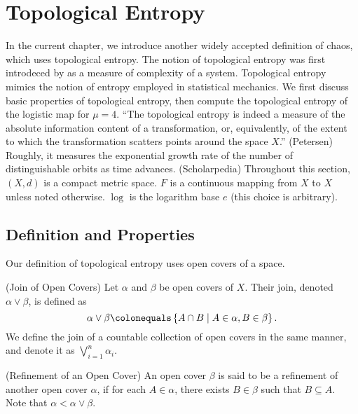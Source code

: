 \documentclass[12pt,twoside,draft]{book}
\begin{document}
\chapter{Topological Entropy}
In the current chapter, we introduce another widely accepted definition of chaos, which uses topological entropy.
The notion of topological entropy was first introdeced by \citet{akm} as a measure of complexity of a system.
Topological entropy mimics the notion of entropy employed in statistical mechanics.
We first discuss basic properties of topological entropy, then compute the topological entropy of the logistic map for $\mu = 4$.
``The topological entropy is indeed a measure of the absolute information content of a transformation, or, equivalently, of the extent to which the transformation scatters points around the space $X$.'' (Petersen)
Roughly, it measures the exponential growth rate of the number of distinguishable orbits as time advances. (Scholarpedia)
Throughout this section, $(X,d)$ is a compact metric space.
$F$ is a continuous mapping from $X$ to $X$ unless noted otherwise.
$\log$ is the logarithm base $e$ (this choice is arbitrary).

\section{Definition and Properties}
Our definition of topological entropy uses open covers of a space. 

\begin{definition}
  (Join of Open Covers)
  Let $\alpha$ and $\beta$ be open covers of $X$.
  Their join, denoted $\alpha \vee \beta$, is defined as
  \begin{equation*}
    \alpha \vee \beta \ceq \setst{A \cap B}{A \in \alpha, B \in \beta}.
  \end{equation*}
  We define the join of a countable collection of open covers in the same manner, and denote it as $\bigvee\limits_{i = 1}^{n} \alpha_i$.
\end{definition}

\begin{definition}
  (Refinement of an Open Cover)
  An open cover $\beta$ is said to be a refinement of another open cover $\alpha$, if for each $A \in \alpha$, there exists $B \in \beta$ such that $B \subseteq A$.
  Note that $\alpha < \alpha \vee \beta$.
\end{definition}
\end{document}
